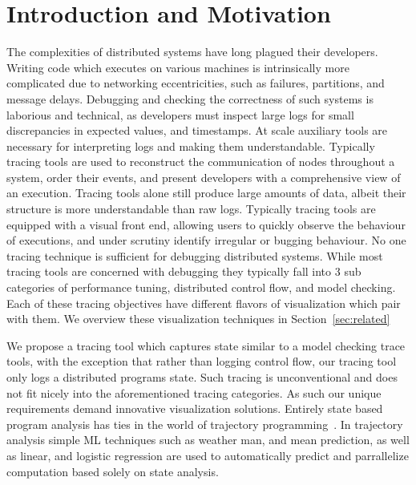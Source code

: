 \section{Introduction and Motivation}
\label{sec:intro}


The complexities of distributed systems have long plagued their
developers. Writing code which executes on various machines is
intrinsically more complicated due to networking eccentricities, such
as failures, partitions, and message delays. Debugging and checking
the correctness of such systems is laborious and technical, as
developers must inspect large logs for small discrepancies in expected
values, and timestamps. At scale auxiliary tools are necessary for
interpreting logs and making them understandable. Typically tracing tools
are used to reconstruct the communication of nodes throughout a
system, order their events, and present developers with a
comprehensive view of an execution.
    Tracing tools alone still produce large amounts of data, albeit
    their structure is more understandable than raw logs. Typically
    tracing tools are equipped with a visual front end, allowing users
    to quickly observe the behaviour of executions, and under scrutiny
    identify irregular or bugging behaviour. No one tracing technique
    is sufficient for debugging distributed systems. While most tracing
    tools are concerned with debugging they typically fall into 3 sub
    categories of performance tuning, distributed control flow, and
    model checking. Each of these tracing objectives have different
    flavors of visualization which pair with them. We overview these
    visualization techniques in Section~\ref{sec:related}

We propose a tracing tool which captures state similar to a model
checking trace tools, with the exception that rather than logging
control flow, our tracing tool only logs a distributed programs state.
Such tracing is unconventional and does not fit nicely into the
aforementioned tracing categories. As such our unique requirements
demand innovative visualization solutions. Entirely state based program
analysis has ties in the world of trajectory
programming~\cite{Waterland:2014:AAS:2654822.2541985,181250,Waterland:2013:CC:2485732.2485749}.
In trajectory analysis simple ML techniques such as weather man, and
mean prediction, as well as linear, and logistic regression are used
to automatically predict and parrallelize computation based solely on
state analysis.

